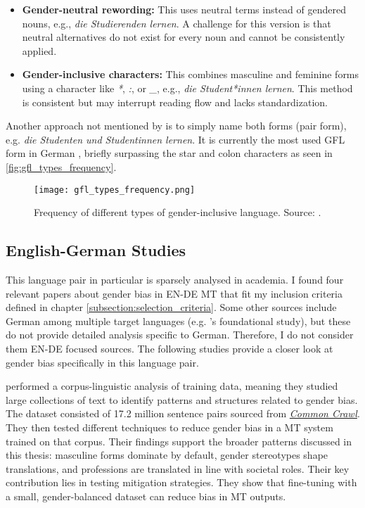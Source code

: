 \begin{itemize}
    \item \textbf{Gender-neutral rewording:}  
    This uses neutral terms instead of gendered nouns, e.g., \textit{die Studierenden lernen}. A challenge for this version is that neutral alternatives do not exist for every noun and cannot be consistently applied.

    \item \textbf{Gender-inclusive characters:}  
    This combines masculine and feminine forms using a character like \textit{*}, \textit{:}, or \textit{\_}, e.g., \textit{die Student*innen lernen}. This method is consistent but may interrupt reading flow and lacks standardization.
\end{itemize}

\noindent Another approach not mentioned by \citeauthor{lardelliBuildingBridgesDataset2024} is to simply name both forms (pair form), e.g. \textit{die Studenten und Studentinnen lernen}. It is currently the most used GFL form in German \citep{waldendorfWordsChangeIncrease2024}, briefly surpassing the star and colon characters as seen in \autoref{fig:gfl_types_frequency}.

\begin{figure}
	\centering
		\texttt{[image: gfl\_types\_frequency.png]}
	\caption{Frequency of different types of gender-inclusive language. Source: \citet{waldendorfWordsChangeIncrease2024}.}
	\label{fig:gfl_types_frequency}
\end{figure}


\subsection{English-German Studies}
This language pair in particular is sparsely analysed in academia. I found four relevant papers about gender bias in EN-DE MT that fit my inclusion criteria defined in chapter \ref{subsection:selection_criteria}. Some other sources include German among multiple target languages (e.g. \citeauthor{stanovskyEvaluatingGenderBias2019}'s foundational study), but these do not provide detailed analysis specific to German. Therefore, I do not consider them EN-DE focused sources. The following studies provide a closer look at gender bias specifically in this language pair.

\textbf{\cite{ullmannGenderBiasMachine2022}} performed a corpus-linguistic analysis of training data, meaning they studied large collections of text to identify patterns and structures related to gender bias. The dataset consisted of 17.2 million sentence pairs sourced from \href{https://commoncrawl.org/}{\textit{Common Crawl}}. They then tested different techniques to reduce gender bias in a MT system trained on that corpus. Their findings support the broader patterns discussed in this thesis: masculine forms dominate by default, gender stereotypes shape translations, and professions are translated in line with societal roles. Their key contribution lies in testing mitigation strategies. They show that fine-tuning with a small, gender-balanced dataset can reduce bias in MT outputs. 

